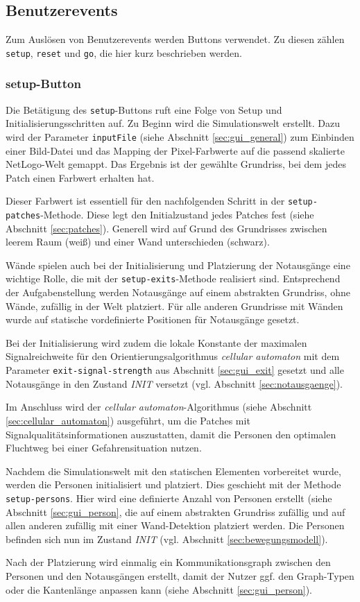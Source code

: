\subsection{Benutzerevents}
\label{sec:gui_userevents}

Zum Auslösen von Benutzerevents werden Buttons verwendet. Zu diesen zählen \verb|setup|, \verb|reset| und \verb|go|, die hier kurz beschrieben werden.

\subsubsection*{setup-Button}

Die Betätigung des \verb|setup|-Buttons ruft eine Folge von Setup und Initialisierungsschritten auf. Zu Beginn wird die Simulationswelt erstellt. Dazu wird der Parameter \verb|inputFile| (siehe Abschnitt \ref{sec:gui_general}) zum Einbinden einer Bild-Datei und das Mapping der Pixel-Farbwerte auf die passend skalierte NetLogo-Welt gemappt. Das Ergebnis ist der gewählte Grundriss, bei dem jedes Patch einen Farbwert erhalten hat.

Dieser Farbwert ist essentiell für den nachfolgenden Schritt in der \verb|setup-patches|-Methode. Diese legt den Initialzustand jedes Patches fest (siehe Abschnitt \ref{sec:patches}). Generell wird auf Grund des Grundrisses zwischen leerem Raum (weiß) und einer Wand unterschieden (schwarz). 

Wände spielen auch bei der Initialisierung und Platzierung der Notausgänge eine wichtige Rolle, die mit der \verb|setup-exits|-Methode realisiert sind. Entsprechend der Aufgabenstellung werden Notausgänge auf einem abstrakten Grundriss, ohne Wände, zufällig in der Welt platziert. Für alle anderen Grundrisse mit Wänden wurde auf statische vordefinierte Positionen für Notausgänge gesetzt.\par
Bei der Initialisierung wird zudem die lokale Konstante der maximalen Signalreichweite für den Orientierungsalgorithmus \emph{cellular automaton} mit dem Parameter \verb|exit-signal-strength| aus Abschnitt \ref{sec:gui_exit} gesetzt und alle Notausgänge in den Zustand \emph{INIT} versetzt (vgl. Abschnitt \ref{sec:notausgaenge}).\par
Im Anschluss wird der \emph{cellular automaton}-Algorithmus (siehe Abschnitt \ref{sec:cellular_automaton}) ausgeführt, um die Patches mit Signalqualitätsinformationen auszustatten, damit die Personen den optimalen Fluchtweg bei einer Gefahrensituation nutzen.

Nachdem die Simulationswelt mit den statischen Elementen vorbereitet wurde, werden die Personen initialisiert und platziert. Dies geschieht mit der Methode \verb|setup-persons|. Hier wird eine definierte Anzahl von Personen erstellt (siehe Abschnitt \ref{sec:gui_person}, die auf einem abstrakten Grundriss zufällig und auf allen anderen zufällig mit einer Wand-Detektion platziert werden. Die Personen befinden sich nun im Zustand \emph{INIT} (vgl. Abschnitt \ref{sec:bewegungsmodell}).\par
Nach der Platzierung wird einmalig ein Kommunikationsgraph zwischen den Personen und den Notausgängen erstellt, damit der Nutzer ggf. den Graph-Typen oder die Kantenlänge anpassen kann (siehe Abschnitt \ref{sec:gui_person}).
 
